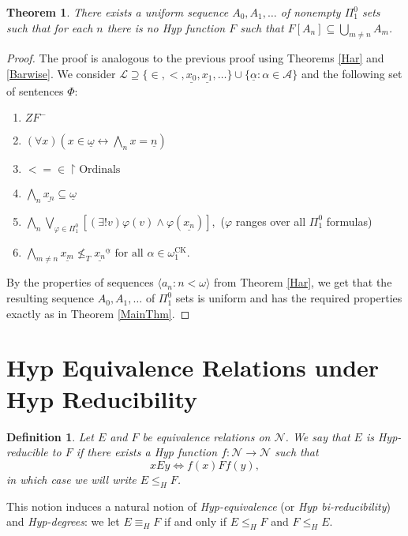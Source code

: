 \documentclass[11pt, english]{article}
\newtheorem{thm}{Theorem}
\newtheorem{defn}{Definition}
\newcommand{\A}{\mbox{$\mathcal{A}$}}
\newcommand{\LL}{\mbox{$\mathcal{L}$}}
\DeclareMathOperator{\ck}{CK}
\newcommand{\baire}{\mathscr N}
\begin{document}
\begin{thm}\label{MainInf}
There exists a uniform sequence $A_0, A_1,\ldots$ of nonempty
$\Pi^0_1$ sets such that for each $n$ there is no Hyp function $F$
such that $F[A_n]\subseteq \bigcup_{m\neq n}A_m$.
\end{thm}

\begin{proof}
The proof is analogous to the previous proof using Theorems
\ref{Har} and \ref{Barwise}. We consider
$\LL\supseteq\{\in,<,\underline{x_0},\underline{x_1},\ldots\}\cup\{\underline{\alpha}:\alpha\in
\A\}$ and the following set of sentences $\Phi$:
\begin{enumerate}[(1)]
 \item $ZF^-$
 \item $(\forall x)(x\in \underline{\omega}\leftrightarrow \bigwedge_n x=\underline{n})$
 \item $<=\in\upharpoonright\text{Ordinals}$
 \item $\bigwedge_n\underline{x_n}\subseteq\underline\omega$
 \item $\bigwedge_n\bigvee_{\varphi\in\Pi^0_1}\left[(\exists!v)\varphi(v)\wedge\varphi(\underline{x_n})\right]$,\ ($\varphi$ ranges over all $\Pi^0_1$
 formulas)
 \item $\bigwedge_{m\neq n} \underline{x_m}\nleq_T \underline{x_n}^{\underline{\alpha}}\text{ for all }\alpha\in \omega_1^{\ck}\text{.}$

\end{enumerate}
By the properties of sequences $\langle a_n : n < \omega\rangle$
from Theorem \ref{Har}, we get that the resulting sequence
$A_0,A_1,\ldots$ of $\Pi^0_1$ sets is uniform and has the required
properties exactly as in Theorem \ref{MainThm}.
\end{proof}



\section{Hyp Equivalence Relations under Hyp Reducibility}

\begin{defn}
Let $E$ and $F$ be equivalence relations on $\baire$. We say that
$E$ is \emph{Hyp-reducible} to $F$ if there exists a Hyp function
$f:\baire\to\baire$ such that
$$
xEy\iff f(x)Ff(y),
$$
in which case we will write $E\leq_H F$.
\end{defn}
This notion induces a natural notion of \emph{Hyp-equivalence} (or
\emph{Hyp bi-reducibility}) and \emph{Hyp-degrees}: we let
$E\equiv_H F$ if and only if $E\leq_H F$ and $F\leq_H E$.
\end{document}
